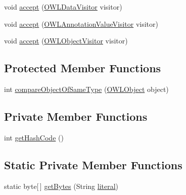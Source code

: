 \begin{DoxyCompactItemize}
\item 
void \hyperlink{classuk_1_1ac_1_1manchester_1_1cs_1_1owl_1_1owlapi_1_1_o_w_l_literal_impl_no_compression_aa7c8fc593f070b52c091790f2d301969}{accept} (\hyperlink{interfaceorg_1_1semanticweb_1_1owlapi_1_1model_1_1_o_w_l_data_visitor}{O\-W\-L\-Data\-Visitor} visitor)
\item 
void \hyperlink{classuk_1_1ac_1_1manchester_1_1cs_1_1owl_1_1owlapi_1_1_o_w_l_literal_impl_no_compression_ad4635e8e7239a7dcf4a7fe6f26903869}{accept} (\hyperlink{interfaceorg_1_1semanticweb_1_1owlapi_1_1model_1_1_o_w_l_annotation_value_visitor}{O\-W\-L\-Annotation\-Value\-Visitor} visitor)
\item 
void \hyperlink{classuk_1_1ac_1_1manchester_1_1cs_1_1owl_1_1owlapi_1_1_o_w_l_literal_impl_no_compression_aa7098ce5c50004dd4b395f187f60f967}{accept} (\hyperlink{interfaceorg_1_1semanticweb_1_1owlapi_1_1model_1_1_o_w_l_object_visitor}{O\-W\-L\-Object\-Visitor} visitor)
\end{DoxyCompactItemize}
\subsection*{Protected Member Functions}
\begin{DoxyCompactItemize}
\item 
int \hyperlink{classuk_1_1ac_1_1manchester_1_1cs_1_1owl_1_1owlapi_1_1_o_w_l_literal_impl_no_compression_a6eeb519ae92c172a7340a43015f44782}{compare\-Object\-Of\-Same\-Type} (\hyperlink{interfaceorg_1_1semanticweb_1_1owlapi_1_1model_1_1_o_w_l_object}{O\-W\-L\-Object} object)
\end{DoxyCompactItemize}
\subsection*{Private Member Functions}
\begin{DoxyCompactItemize}
\item 
int \hyperlink{classuk_1_1ac_1_1manchester_1_1cs_1_1owl_1_1owlapi_1_1_o_w_l_literal_impl_no_compression_a30586fec825c91c796fc3aedb712d666}{get\-Hash\-Code} ()
\end{DoxyCompactItemize}
\subsection*{Static Private Member Functions}
\begin{DoxyCompactItemize}
\item 
static byte\mbox{[}$\,$\mbox{]} \hyperlink{classuk_1_1ac_1_1manchester_1_1cs_1_1owl_1_1owlapi_1_1_o_w_l_literal_impl_no_compression_a44061cd33ead93dd1ecb20c4568632ac}{get\-Bytes} (String \hyperlink{classuk_1_1ac_1_1manchester_1_1cs_1_1owl_1_1owlapi_1_1_o_w_l_literal_impl_no_compression_a42ec8de09641c8de35ae44f159540fb9}{literal})
\end{DoxyCompactItemize}
